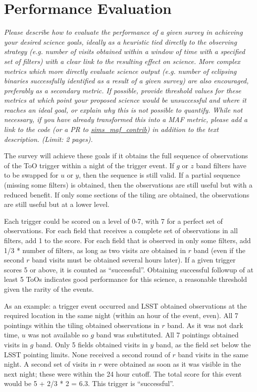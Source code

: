 \documentclass[11pt]{article}
\begin{document}
\section{Performance Evaluation}
\begin{footnotesize}
{\it Please describe how to evaluate the performance of a given survey in achieving your desired
science goals, ideally as a heuristic tied directly to the observing strategy (e.g. number of visits obtained
within a window of time with a specified set of filters) with a clear link to the resulting effect on science.
More complex metrics which more directly evaluate science output (e.g. number of eclipsing binaries successfully
identified as a result of a given survey) are also encouraged, preferably as a secondary metric.
If possible, provide threshold values for these metrics at which point your proposed science would be unsuccessful 
and where it reaches an ideal goal, or explain why this is not possible to quantify. While not necessary, 
if you have already transformed this into a MAF metric, please add a link to the code (or a PR to 
\href{https://github.com/lsst-nonproject/sims_maf_contrib}{sims\_maf\_contrib}) in addition to the text description. (Limit: 2 pages).}
\end{footnotesize}

The survey will achieve these goals if it obtains the full sequence of observations of the ToO trigger within a night of the trigger event. If $g$ or $z$ band filters 
have to be swapped for $u$ or $y$, then the sequence is still valid. If a partial sequence (missing some filters) is obtained, then the observations are still useful 
but with a reduced benefit. If only some sections of the tiling are obtained, the observations are still useful but at a lower level. 

Each trigger could be scored on a level of 0-7, with 7 for a perfect set of observations. For each field that receives a complete set of observations in all filters, add 1 to
the score. For each field that is observed in only some filters, add 1/3 * number of filters, as long as two visits are obtained in $r$ band (even if the second
$r$ band visits must be obtained several hours later). If a given trigger scores 5 or above, it is counted as ``successful''. Obtaining 
successful followup of at least 5 ToOs indicates good performance for this science, a reasonable threshold given the rarity of the events.

As an example: a trigger event occurred and LSST obtained observations at the required location in the same night (within an hour of the event, even). All 7 pointings 
within the tiling obtained observations in $r$ band. As it was not dark time, $u$ was not available so $g$ band was substituted. All 7 pointings obtained visits in $g$ 
band. Only 5 fields obtained visits in $y$ band, as the field set below the LSST pointing limits. None received a second round of $r$ band visits in the same night.
A second set of visits in $r$ were obtained as soon as it was visible in the next night; these were within the 24 hour cutoff. 
The total score for this event would be 5 + 2/3 * 2 = 6.3. This trigger is ``successful''.  
\end{document}
